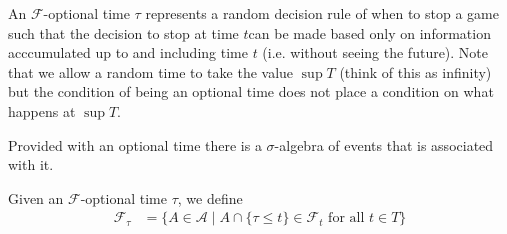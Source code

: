 An $\mathcal{F}$-optional time $\tau$ represents a random decision
rule of when to stop a game such that the decision  to stop at time $t$can be made based only on
information acccumulated up to and including time $t$ (i.e. without
seeing the future).  Note that we allow a random time to take the value $\sup T$ (think of
this as infinity) but the condition of being an optional time does not
place a condition on what happens at $\sup T$.

Provided with an optional time there is a $\sigma$-algebra of events
that is associated with it.
\begin{defn}Given an $\mathcal{F}$-optional time $\tau$, we define 
\begin{align*}
\mathcal{F}_\tau &= \lbrace
  A \in \mathcal{A} \mid A \cap \lbrace \tau \leq t \rbrace\in
    \mathcal{F}_t \text{ for all } t \in T \rbrace
\end{align*}
\end{defn}

